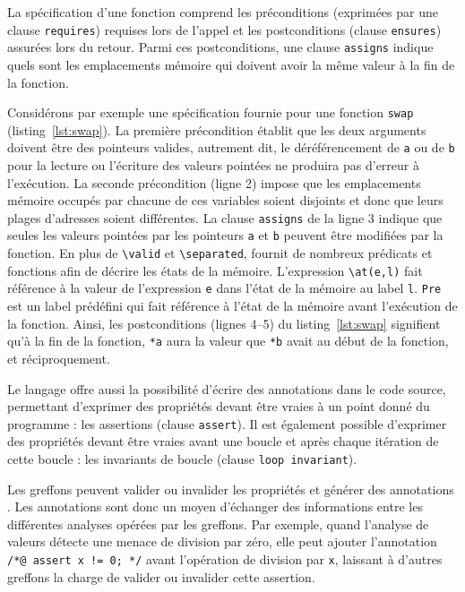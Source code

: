 La spécification d'une fonction comprend les préconditions (exprimées par une
clause \lstinline'requires') requises lors de l'appel et les postconditions
(clause \lstinline'ensures') assurées lors du retour.
Parmi ces postconditions, une clause \lstinline'assigns' indique quels sont les
emplacements mémoire qui doivent avoir la même valeur à la fin de la fonction.



Considérons par exemple une spécification fournie pour une fonction
\lstinline'swap' (listing~\ref{lst:swap}).
La première précondition établit que les deux arguments doivent être des
pointeurs valides, autrement dit, le déréférencement de \lstinline'a' ou de
\lstinline'b' pour la lecture ou l'écriture des valeurs pointées ne produira pas
d'erreur à l'exécution.
La seconde précondition (ligne 2) impose que les emplacements mémoire occupés
par chacune de ces variables soient disjoints et donc que leurs plages
d'adresses soient différentes.
La clause \lstinline'assigns' de la ligne 3 indique que seules les valeurs
pointées par les pointeurs \lstinline'a' et \lstinline'b' peuvent être modifiées
par la fonction.
En plus de \lstinline'\valid' et \lstinline'\separated', \acsl fournit de
nombreux prédicats et fonctions afin de décrire les états de la mémoire.
L'expression \lstinline'\at(e,l)' fait référence à la valeur de l'expression
\lstinline'e' dans l'état de la mémoire au label \lstinline'l'.
\lstinline'Pre' est un label prédéfini qui fait référence à l'état de la mémoire
avant l'exécution de la fonction.
Ainsi, les postconditions (lignes 4--5) du listing~\ref{lst:swap} signifient
qu'à la fin de la fonction, \lstinline'*a' aura la valeur que \lstinline'*b'
avait au début de la fonction, et réciproquement.

Le langage \acsl offre aussi la possibilité d'écrire des annotations dans le
code source, permettant d'exprimer des propriétés devant être vraies à un point
donné du programme : les assertions (clause \lstinline'assert').
Il est également possible d'exprimer des propriétés devant être vraies avant une
boucle et après chaque itération de cette boucle : les invariants de boucle
(clause \lstinline'loop invariant').

Les greffons peuvent valider ou invalider les propriétés \acsl et
générer des annotations \acsl.
Les annotations sont donc un moyen d'échanger des informations entre les
différentes analyses opérées par les greffons.
Par exemple, quand l'analyse de valeurs détecte une menace de division par zéro,
elle peut ajouter l'annotation \lstinline'/*@ assert x != 0; */' avant
l'opération de division par \lstinline'x', laissant à d'autres greffons la
charge de valider ou invalider cette assertion.


